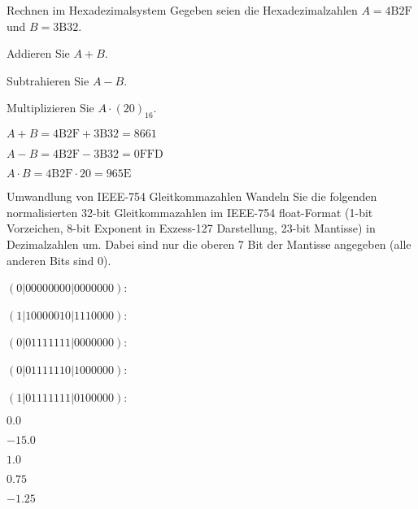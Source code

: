 \documentclass{exercisesheet}
\begin{document}
\begin{exercise*}{Rechnen im Hexadezimalsystem}
  {Gegeben seien die Hexadezimalzahlen $A = \mathrm{4B2F}$ und $B = \mathrm{3B32}$.}
  \item Addieren Sie $A+B$.
  \item Subtrahieren Sie $A-B$.
  \item Multiplizieren Sie $A\cdot (20)_{16}$.
\end{exercise*}

\begin{solution**}
  \item $A + B = \mathrm{4B2F} + \mathrm{3B32} = \mathrm{8661}$
  \item $A - B = \mathrm{4B2F} - \mathrm{3B32} = \mathrm{0FFD}$
  \item $A \cdot B = \mathrm{4B2F} \cdot 20 = \mathrm{965E}$
\end{solution**}

\begin{exercise*}{Umwandlung von IEEE-754 Gleitkommazahlen}{
    Wandeln Sie die folgenden normalisierten 32-bit Gleitkommazahlen im IEEE-754 float-Format (1-bit Vorzeichen, 8-bit Exponent in Exzess-127 Darstellung, 23-bit Mantisse) in Dezimalzahlen um. Dabei sind nur die oberen 7 Bit der Mantisse angegeben (alle anderen Bits sind 0).
  }
  \item $(0|0000 0000|0000 000)$:
  \item $(1|1000 0010|1110 000)$:
  \item $(0|0111 1111|0000 000)$:
  \item $(0|0111 1110|1000 000)$:
  \item $(1|0111 1111|0100 000)$:
\end{exercise*}

\begin{solution**}
  \item $0.0$
  \item $-15.0$
  \item $1.0$
  \item $0.75$
  \item $-1.25$
\end{solution**}
\end{document}
